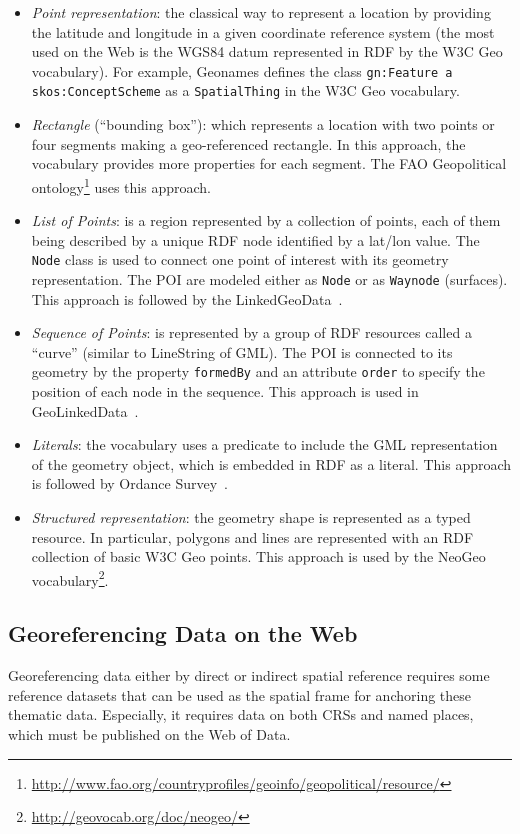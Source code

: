 \begin{itemize}
  \item \textit{Point representation}: the classical way to represent a location by providing the latitude and longitude in a given coordinate reference system (the most used on the Web is the WGS84 datum represented in RDF by the W3C Geo vocabulary). For example, Geonames defines the class \texttt{gn:Feature a skos:ConceptScheme} as a \texttt{SpatialThing} in the W3C Geo vocabulary.
  
  \item \textit{Rectangle} (``bounding box''): which represents a location with two points or four segments making a geo-referenced rectangle. In this approach, the vocabulary provides more properties for each segment. The FAO Geopolitical ontology\footnote{\url{http://www.fao.org/countryprofiles/geoinfo/geopolitical/resource/}} uses this approach.
  
  \item \textit{List of Points}: is a region represented by a collection of points, each of them being described by a unique RDF node identified by a lat/lon value. The \texttt{Node} class is used to connect one point of interest with its geometry representation. The POI are modeled either as \texttt{Node} or as \texttt{Waynode} (surfaces). This approach is followed by the LinkedGeoData~\cite{linkedgeodata}.
  
  \item \textit{Sequence of Points}: is represented by a group of RDF resources called a ``curve'' (similar to LineString of GML). The POI is connected to its geometry by the property \texttt{formedBy} and an attribute \texttt{order} to specify the position of each node in the sequence. This approach is used in GeoLinkedData~\cite{deLeon2010}.
  \item \textit{Literals}: the vocabulary uses a predicate to include the GML representation of the geometry object, which is embedded in RDF as a literal. This approach is followed by Ordance Survey~\cite{Goodwin2008}.
  \item \textit{Structured representation}: the geometry shape is represented as a typed resource. In particular, polygons and lines are represented with an RDF collection of basic W3C Geo points. This approach is used by the NeoGeo vocabulary\footnote{\url{http://geovocab.org/doc/neogeo/}}.
\end{itemize}




\subsection{Georeferencing Data on the Web}
\label{sec:georef}
Georeferencing data either by direct or indirect spatial reference requires some reference datasets that can be used as the spatial frame for anchoring these thematic data. Especially, it requires data on both CRSs and named places, which must be published on the Web of Data.

